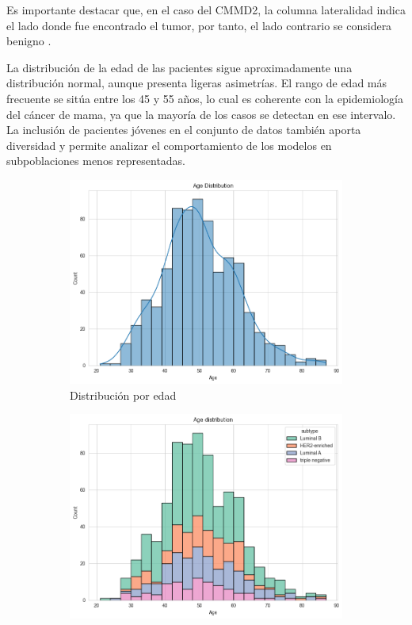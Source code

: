\documentclass[a4paper,10pt]{book}
\begin{document}
Es importante destacar que, en el caso del CMMD2, la columna lateralidad indica el lado donde fue encontrado el tumor, por tanto, el lado contrario se considera benigno \cite{cai_online_2023}.

La distribución de la edad de las pacientes sigue aproximadamente una distribución normal, aunque presenta ligeras asimetrías. El rango de edad más frecuente se sitúa entre los 45 y 55 años, lo cual es coherente con la epidemiología del cáncer de mama, ya que la mayoría de los casos se detectan en ese intervalo. La inclusión de pacientes jóvenes en el conjunto de datos también aporta diversidad y permite analizar el comportamiento de los modelos en subpoblaciones menos representadas.

\begin{figure}[h!]
    \centering
    \begin{subfigure}[c]{0.49\textwidth}
        \centering
        \includegraphics[width=\textwidth]{reports//assets/age.png}
        \caption{Distribución por edad}
        \label{fig:age_dist}
    \end{subfigure}
    \begin{subfigure}[c]{0.49\textwidth}
        \centering
        \includegraphics[width=\textwidth]{reports/assets/age_subtype.png}

\end{subfigure}
\end{figure}
\end{document}
